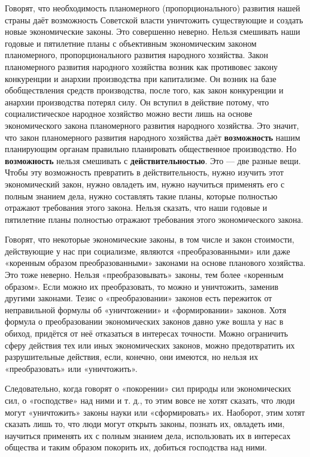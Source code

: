 \documentclass[12pt, a4paper, openany]{book}
\begin{document}
Говорят, что необходимость планомерного (пропорционального) развития нашей страны даёт возможность Советской власти уничтожить существующие и создать новые экономические законы. Это совершенно неверно. Нельзя смешивать наши годовые и пятилетние планы с объективным экономическим законом планомерного, пропорционального развития народного хозяйства. Закон планомерного развития народного хозяйства возник как противовес закону конкуренции и анархии производства при капитализме. Он возник на базе обобществления средств производства, после того, как закон конкуренции и анархии производства потерял силу. Он вступил в действие потому, что социалистическое народное хозяйство можно вести лишь на основе экономического закона планомерного развития народного хозяйства. Это значит, что закон планомерного развития народного хозяйства даёт \textbf{возможность} нашим планирующим органам правильно планировать общественное производство. Но \textbf{возможность} нельзя смешивать с \textbf{действительностью}. Это — две разные вещи. Чтобы эту возможность превратить в действительность, нужно изучить этот экономический закон, нужно овладеть им, нужно научиться применять его с полным знанием дела, нужно составлять такие планы, которые полностью отражают требования этого закона. Нельзя сказать, что наши годовые и пятилетние планы полностью отражают требования этого экономического закона.

Говорят, что некоторые экономические законы, в том числе и закон стоимости, действующие у нас при социализме, являются «преобразованными» или даже «коренным образом преобразованными» законами на основе планового хозяйства. Это тоже неверно. Нельзя «преобразовывать» законы, тем более «коренным образом». Если можно их преобразовать, то можно и уничтожить, заменив другими законами. Тезис о «преобразовании» законов есть пережиток от неправильной формулы об «уничтожении» и «формировании» законов. Хотя формула о преобразовании экономических законов давно уже вошла у нас в обиход, придётся от неё отказаться в интересах точности. Можно ограничить сферу действия тех или иных экономических законов, можно предотвратить их разрушительные действия, если, конечно, они имеются, но нельзя их «преобразовать» или «уничтожить».

Следовательно, когда говорят о «покорении» сил природы или экономических сил, о «господстве» над ними и т. д., то этим вовсе не хотят сказать, что люди могут «уничтожить» законы науки или «сформировать» их. Наоборот, этим хотят сказать лишь то, что люди могут открыть законы, познать их, овладеть ими, научиться применять их с полным знанием дела, использовать их в интересах общества и таким образом покорить их, добиться господства над ними.
\end{document}
